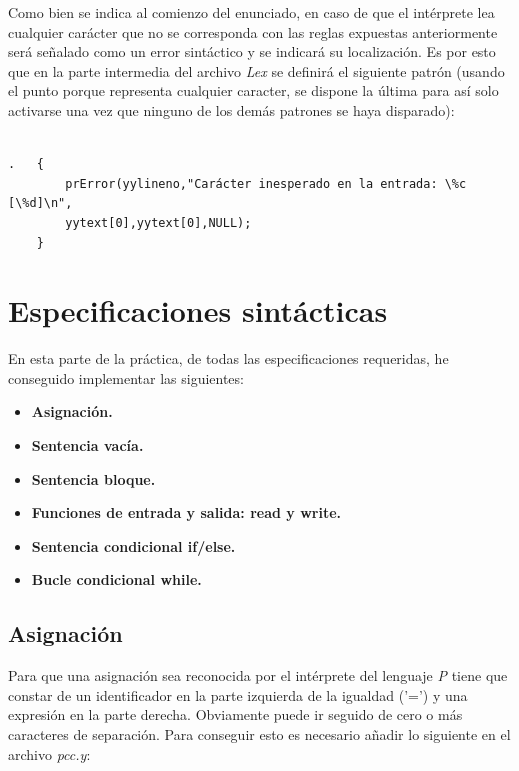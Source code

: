 \documentclass[11pt]{article}
\begin{document}
\noindent Como bien se indica al comienzo del enunciado, en caso de que el intérprete lea cualquier carácter que no se corresponda con las reglas expuestas anteriormente será señalado como un error sintáctico y se indicará su localización. Es por esto que en la parte intermedia del archivo \textit{Lex} se definirá el siguiente patrón (usando el punto porque representa cualquier caracter, se dispone la última para así solo activarse una vez que ninguno de los demás patrones se haya disparado):

\begin{verbatim}

.   {
        prError(yylineno,"Carácter inesperado en la entrada: \%c [\%d]\n",
        yytext[0],yytext[0],NULL);
    }

\end{verbatim}

\section{Especificaciones sintácticas}

\noindent En esta parte de la práctica, de todas las especificaciones requeridas, he conseguido implementar las siguientes: 

\begin{itemize}
    \item \textbf{Asignación.}
    \item \textbf{Sentencia vacía.}
    \item \textbf{Sentencia bloque.}
    \item \textbf{Funciones de entrada y salida: read y write.}
    \item \textbf{Sentencia condicional if/else.}
    \item \textbf{Bucle condicional while.}

\end{itemize}

\subsection{Asignación}

\noindent Para que una asignación sea reconocida por el intérprete del lenguaje \textit{P} tiene que constar de un identificador en la parte izquierda de la igualdad ('=') y una expresión en la parte derecha. Obviamente puede ir seguido de cero o más caracteres de separación. Para conseguir esto es necesario añadir lo siguiente en el archivo \textit{pcc.y}:
\end{document}
